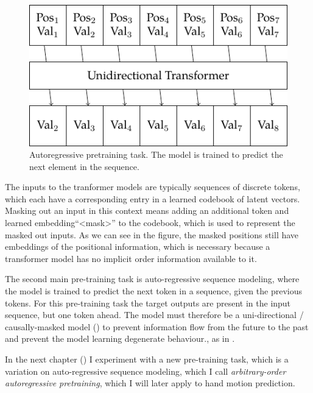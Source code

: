 \begin{figure}
    \centering
    \includegraphics[width=\linewidth]{figures/pretraining-causal.pdf}
    \caption[Autoregressive Sequence Modeling Pretraining]{Autoregressive pretraining task. The model is trained to predict the next element in the sequence.}
    \label{fig:pretraining-causal}
\end{figure}

The inputs to the tranformer models are typically sequences of discrete tokens, which each have a corresponding entry in a learned codebook of latent vectors. Masking out an input in this context means adding an additional token and learned embedding``<mask>'' to the codebook, which is used to represent the masked out inputs. As we can see in the figure, the masked positions still have embeddings of the positional information, which is necessary because a transformer model has no implicit order information available to it.

The second main pre-training task is auto-regressive sequence modeling, where the model is trained to predict the next token in a sequence, given the previous tokens. For this pre-training task the target outputs are present in the input sequence, but one token ahead. The model must therefore be a uni-directional / causally-masked model () to prevent information flow from the future to the past and prevent the model learning degenerate behaviour., as in .



In the next chapter () I experiment with a new pre-training task, which is a variation on auto-regressive sequence modeling, which I call \textit{arbitrary-order autoregressive pretraining}, which I will later apply to hand motion prediction.
